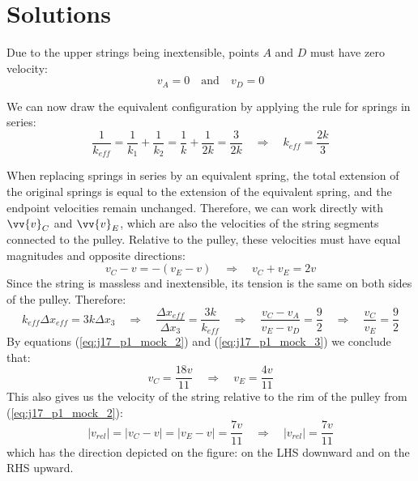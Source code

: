 \newpage
\section*{\centering Solutions}
Due to the upper strings being inextensible, points $A$ and $D$ must have zero velocity:
\begin{equation*}
	\boxed{v_A = 0}
	\quad\text{and}\quad
	\boxed{v_D = 0}
	\tag{$1$}
	\label{eq:j17_p1_1}
\end{equation*}

We can now draw the equivalent configuration by applying the rule for springs in series:
\begin{equation*}
	\frac{1}{k_{eff}} = \frac{1}{k_1} + \frac{1}{k_2} = 
	\frac{1}{k} + \frac{1}{2k} = 
	\frac{3}{2k}
	\quad\Rightarrow\quad
	\boxed{k_{eff} = \frac{2k}{3}}
	\tag{$*$}
	\label{eq:j17_p1_mock_1}
\end{equation*}



When replacing springs in series by an equivalent spring, the total extension of the original springs is equal to the extension of the equivalent spring, and the endpoint velocities remain unchanged. Therefore, we can work directly with $\vv{v}_C$ and $\vv{v}_E$, which are also the velocities of the string segments connected to the pulley. Relative to the pulley, these velocities must have equal magnitudes and opposite directions:
\begin{equation*}
	v_C - v = -(v_E - v)
	\quad\Rightarrow\quad
	\boxed{v_C + v_E = 2v}
	\tag{$**$}
	\label{eq:j17_p1_mock_2}
\end{equation*}
Since the string is massless and inextensible, its tension is the same on both sides of the pulley. Therefore:
\begin{equation*}
	k_{eff} \Delta x_{eff} = 3k \Delta x_3
	\quad\Rightarrow\quad
	\frac{\Delta x_{eff}}{\Delta x_3}
	=
	\frac{3k}{k_{eff}}
	\quad\Rightarrow\quad
	\frac{v_C - v_A}{v_E - v_D}
	=
	\frac{9}{2}
	\quad\Rightarrow\quad
	\boxed{\frac{v_C}{v_E} = \frac{9}{2}}
	\tag{$***$}
	\label{eq:j17_p1_mock_3}
\end{equation*}
By equations (\ref{eq:j17_p1_mock_2}) and (\ref{eq:j17_p1_mock_3}) we conclude that:
\begin{equation*}
	\boxed{v_C = \frac{18v}{11}}
	\quad\Rightarrow\quad
	\boxed{v_E = \frac{4v}{11}}
	\tag{$2$}
	\label{eq:j17_p1_2}
\end{equation*}
This also gives us the velocity of the string relative to the rim of the pulley from (\ref{eq:j17_p1_mock_2}):
\begin{equation*}
	|v_{rel}| = |v_C - v| = |v_E - v| = \frac{7v}{11}
	\quad\Rightarrow\quad
	\boxed{|v_{rel}| = \frac{7v}{11}}
	\tag{$3$}
	\label{eq:j17_p1_3}
\end{equation*}
which has the direction depicted on the figure: on the LHS downward and on the RHS upward.

